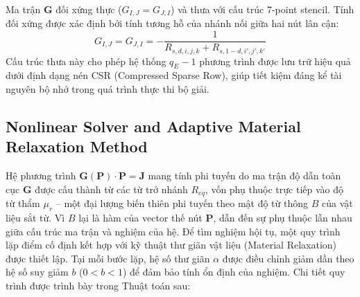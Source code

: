 Ma trận $\mathbf{G}$ đối xứng thực ($G_{I,J} = G_{J,I}$) và thưa với cấu trúc 7-point stencil. Tính đối xứng được xác định bởi tính tương hỗ của nhánh nối giữa hai nút lân cận:
\begin{equation}
    G_{I,J} = G_{J,I} = -\frac{1}{R_{s,d,i,j,k} + R_{s,1-d,i',j',k'}}
\end{equation}
Cấu trúc thưa này cho phép hệ thống $q_E - 1$ phương trình được lưu trữ hiệu quả dưới định dạng nén CSR (Compressed Sparse Row), giúp tiết kiệm đáng kể tài nguyên bộ nhớ trong quá trình thực thi bộ giải.

\subsection{Nonlinear Solver and Adaptive Material Relaxation Method}

Hệ phương trình $\mathbf{G}(\mathbf{P}) \cdot \mathbf{P} = \mathbf{J}$ mang tính phi tuyến do ma trận độ dẫn toàn cục $\mathbf{G}$ được cấu thành từ các từ trở nhánh $R_{eq}$, vốn phụ thuộc trực tiếp vào độ từ thẩm $\mu_r$ – một đại lượng biến thiên phi tuyến theo mật độ từ thông $B$ của vật liệu sắt từ. Vì $B$ lại là hàm của vector thế nút $\mathbf{P}$, dẫn đến sự phụ thuộc lẫn nhau giữa cấu trúc ma trận và nghiệm của hệ. Để tìm nghiệm hội tụ, một quy trình lặp điểm cố định kết hợp với kỹ thuật thư giãn vật liệu (Material Relaxation) được thiết lập. Tại mỗi bước lặp, hệ số thư giãn $\alpha$ được điều chỉnh giảm dần theo hệ số suy giảm $b$ ($0 < b < 1$) để đảm bảo tính ổn định của nghiệm. Chi tiết quy trình được trình bày trong Thuật toán sau:

